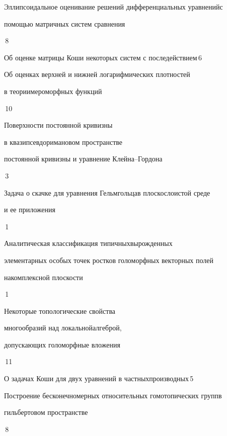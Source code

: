 

{Эллипсоидальное оценивание решений дифференциальных уравнений\newline с 


помощью матричных систем сравнения}{\No\,8}




{Об оценке матрицы Коши некоторых систем с последействием}{\No\,6}




{Об оценках верхней и нижней логарифмических плотностей


в теории\newline мероморфных функций}{\No\,10}




{Поверхности постоянной кривизны


в квазипсевдоримановом пространстве\newline


постоянной кривизны и уравнение Клейна--Гордона}{\No\,3}




{Задача о скачке для уравнения Гельмгольца\newline в плоскослоистой среде


и ее приложения}{\No\,1}




{Аналитическая классификация типичных\newline вырожденных


элементарных особых точек ростков голоморфных векторных полей


на\newline комплексной плоскости}{\No\,1}




{Некоторые топологические свойства 


многообразий над локальной\newline алгеброй, 


допускающих голоморфные вложения}{\No\,11}




{О задачах Коши для двух уравнений в частных\newline производных}{\No\,5}




{Построение бесконечномерных относительных гомотопических групп\newline в 


гильбертовом пространстве}{\No\,8}


